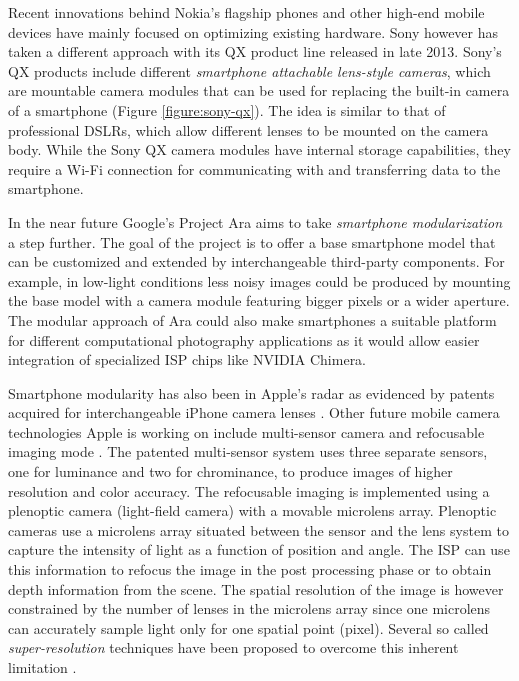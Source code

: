\documentclass[thesis.tex]{subfiles}
\begin{document}
Recent innovations behind Nokia's flagship phones and other high-end mobile devices have mainly focused on optimizing existing hardware. Sony however has taken a different approach with its QX product line released in late 2013. Sony's QX products include different \textit{smartphone attachable lens-style cameras}, which are mountable camera modules that can be used for replacing the built-in camera of a smartphone (Figure \ref{figure:sony-qx}). The idea is similar to that of professional DSLRs, which allow different lenses to be mounted on the camera body. While the Sony QX camera modules have internal storage capabilities, they require a Wi-Fi connection for communicating with and transferring data to the smartphone.

In the near future Google's Project Ara aims to take \textit{smartphone modularization} a step further. The goal of the project is to offer a base smartphone model that can be customized and extended by interchangeable third-party components. For example, in low-light conditions less noisy images could be produced by mounting the base model with a camera module featuring bigger pixels or a wider aperture. The modular approach of Ara could also make smartphones a suitable platform for different computational photography applications as it would allow easier integration of specialized ISP chips like NVIDIA Chimera\texttrademark.

Smartphone modularity has also been in Apple's radar as evidenced by patents acquired for interchangeable iPhone camera lenses \cite{apple_patent_camera_module_3}\cite{apple_patent_camera_module_4}\cite{apple_patent_camera_module_5}. Other future mobile camera technologies Apple is working on include multi-sensor camera and refocusable imaging mode \cite{apple_patent_camera_module_1}\cite{apple_patent_camera_module_2}. The patented multi-sensor system uses three separate sensors, one for luminance and two for chrominance, to produce images of higher resolution and color accuracy. The refocusable imaging is implemented using a plenoptic camera (light-field camera) with a movable microlens array. Plenoptic cameras use a microlens array situated between the sensor and the lens system to capture the intensity of light as a function of position and angle. The ISP can use this information to refocus the image in the post processing phase or to obtain depth information from the scene. The spatial resolution of the image is however constrained by the number of lenses in the microlens array since one microlens can accurately sample light only for one spatial point (pixel). Several so called \textit{super-resolution} techniques have been proposed to overcome this inherent limitation \cite{plenoptic_1}\cite{plenoptic_2}\cite{plenoptic_3}.
\end{document}
